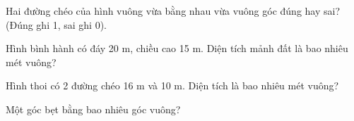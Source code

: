 \begin{ex}
Hai đường chéo của hình vuông vừa bằng nhau vừa vuông góc đúng hay sai? (Đúng ghi 1, sai ghi 0).
\end{ex}

\begin{ex}
Hình bình hành có đáy 20 m, chiều cao 15 m. Diện tích mảnh đất là bao nhiêu mét vuông?
\end{ex}

\begin{ex}
Hình thoi có 2 đường chéo 16 m và 10 m. Diện tích là bao nhiêu mét vuông?
\end{ex}

\begin{ex}
Một góc bẹt bằng bao nhiêu góc vuông?
\end{ex}
